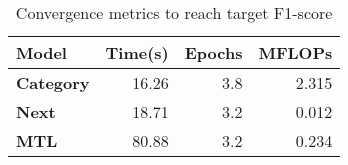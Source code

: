 \begin{table}[htbp]
\centering
\caption{Convergence metrics to reach target F1-score}
\begin{tabular}{|l|r|r|r|}
\hline
\textbf{Model}    & \textbf{Time(s)} & \textbf{Epochs} & \textbf{MFLOPs} \\ \hline
\textbf{Category} & 16.26            & 3.8             & 2.315           \\ \hline
\textbf{Next}     & 18.71            & 3.2             & 0.012           \\ \hline
\textbf{MTL}      & 80.88            & 3.2             & 0.234           \\ \hline
\end{tabular}
\label{table:convergence_comparison}
\end{table}

